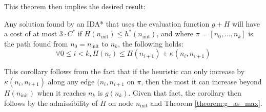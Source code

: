 This theorem then implies the desired result:
\begin{corollary}
\label{corollary:h_increase_policy}
Any solution found by an IDA* that uses the evaluation function $g+H$ will have a cost of at most $3 \cdot C^*$ if $H(n_{\mathrm{init}}) \leq h^*(n_{\mathrm{init}})$, and where $\pi=[n_0, ...,n_k]$ is the path found from $n_0=n_{\mathrm{init}}$ to $n_k$, the following holds:
$$\forall 0 \leq i < k, H(n_i) \leq H(n_{i+1}) + \kappa(n_i, n_{i+1})$$
\end{corollary}
This corollary follows from the fact that if the heuristic can only increase by $\kappa(n_i, n_{i+1})$ along any edge $(n_i, n_{i+1}$ on $\pi$, then the most it can increase beyond $H(n_{\mathrm{init}})$ when it reaches $n_k$ is $g(n_k)$.
Given that fact, the corollary then follows by the admissibility of $H$ on node $n_{\mathrm{init}}$ and Theorem \ref{theorem:g_as_max}.
%
%




